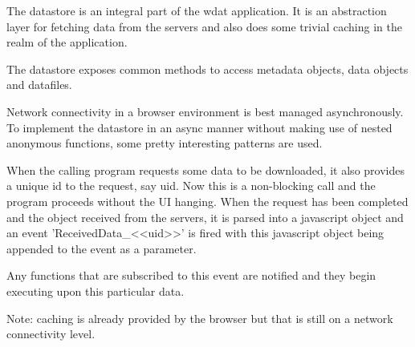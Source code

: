 The datastore is an integral part of the wdat application.  It is an
abstraction layer for fetching data from the servers and also does
some trivial caching in the realm of the application.  

The datastore exposes common methods to access metadata objects, data
objects and datafiles.  

Network connectivity in a browser environment is best managed
asynchronously.  To implement the datastore in an async manner without
making use of nested anonymous functions, some pretty interesting
patterns are used.

When the calling program requests some data to be downloaded, it also
provides a unique id to the request, say uid.  Now this is a
non-blocking call and the program proceeds without the UI hanging.
When the request has been completed and the object received from the
servers, it is parsed into a javascript object and an event
'ReceivedData\_<<uid>>' is fired with this javascript object being
appended to the event as a parameter.

Any functions that are subscribed to this event are notified and they
begin executing upon this particular data.

Note: caching is already provided by the browser but that is still on
a network connectivity level.

